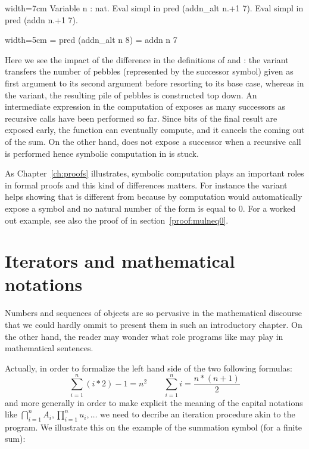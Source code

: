 \begin{coq}{}{width=7cm}
Variable n : nat.
Eval simpl in pred (addn_alt n.+1 7).
Eval simpl in pred (addn n.+1 7).
\end{coq}
\begin{coqout}{}{width=5cm}
= pred (addn_alt n 8)
= addn n 7
\end{coqout}

Here we see the impact of the difference in the definitions of
 and : the  variant transfers the
number of pebbles (represented by the successor  symbol)
given as first argument to its second argument
before resorting to its base case, whereas in the  variant,
the resulting pile of pebbles is constructed top down. An intermediate
expression in the computation of  exposes as many
successors as recursive calls have been performed so far. Since bits
of the final result are exposed early, the  function can
eventually compute, and it cancels the  coming out of the sum.
On the other hand,
 does not expose a successor when a recursive call is
performed hence symbolic computation in  is stuck.

As Chapter~\ref{ch:proofs} illustrates, symbolic computation plays an
important roles in formal proofs and this kind of differences
matters. For instance the  variant helps
showing that  is different from  because by
computation \Coq{} would automatically expose  a  symbol
and no natural number of the form  is equal to 0.
For a worked out example, see also the proof of  in
section~\ref{proof:mulneq0}.


\section{Iterators and mathematical notations}
\label{sec:bigopnat}

Numbers and sequences of objects are so pervasive in the mathematical
discourse that we could hardly ommit to present them in such an
introductory chapter. On the other hand, the reader may wonder what role
programs like  may play in mathematical sentences.

Actually, in order to formalize the left hand side of the two
following formulas:
$$
\sum_{i=1}^n (i * 2) - 1 = n ^ 2 \qquad
\sum_{i=1}^n i = \frac{n * (n + 1)}{2}
$$
and more generally in order to make explicit the meaning of the capital
notations like $\bigcap_{i=1}^nA_i,
\prod_{i=1}^nu_i, \dots$ we need to decribe an iteration procedure
akin to the  program. We illustrate this on the example of
the summation symbol (for a finite sum):

